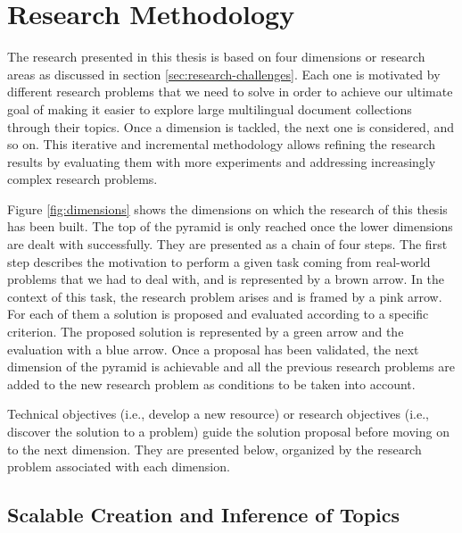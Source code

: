 \section{Research Methodology}\label{sec:research-methodology}

The research presented in this thesis is based on four dimensions or research areas as discussed in section \ref{sec:research-challenges}. Each one is motivated by different research problems that we need to solve in order to achieve our ultimate goal of making it easier to explore large multilingual document collections through their topics. Once a dimension is tackled, the next one is considered, and so on. This iterative and incremental methodology allows  refining the research results by evaluating them with more experiments and addressing increasingly complex research problems.

Figure \ref{fig:dimensions} shows the dimensions on which the research of this thesis has been built. The top of the pyramid is only reached once the lower dimensions are dealt with successfully. They are presented as a chain of four steps. The first step describes the motivation to perform a given task coming from real-world problems that we had to deal with, and is represented by a brown arrow. In the context of this task, the research problem arises and is framed by a pink arrow. For each of them a solution is proposed and evaluated according to a specific criterion. The proposed solution is represented by a green arrow and the evaluation with a blue arrow. Once a proposal has been validated, the next dimension of the pyramid is achievable and all the previous research problems are added to the new research problem as conditions to be taken into account.

Technical objectives (i.e., develop a new resource) or research objectives (i.e., discover the solution to a problem) guide the solution proposal before moving on to the next dimension. They are presented below, organized by the research problem associated with each dimension.


\subsection{Scalable Creation and Inference of Topics}

